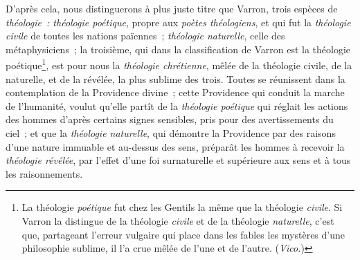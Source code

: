 \documentclass[french,twoside]{book} %
\begin{document}
D’après cela, nous distinguerons à plus juste titre que Varron, trois espèces de {\itshape théologie : théologie poétique}, propre aux {\itshape poètes théologiens}, et qui fut la {\itshape théologie civile} de toutes les nations païennes ; {\itshape théologie naturelle}, celle des métaphysiciens ; la troisième, qui dans la classification de Varron est la  théologie poétique\footnote{La théologie {\itshape poétique} fut chez les Gentils la même que la théologie {\itshape civile}. Si Varron la distingue de la théologie {\itshape civile} et de la théologie {\itshape naturelle}, c’est que, partageant l’erreur vulgaire qui place dans les fables les mystères d’une philosophie sublime, il l’a crue mêlée de l’une et de l’autre. ({\itshape Vico.})}, est pour nous la {\itshape théologie chrétienne}, mêlée de la théologie civile, de la naturelle, et de la révélée, la plus sublime des trois. Toutes se réunissent dans la contemplation de la Providence divine ; cette Providence qui conduit la marche de l’humanité, voulut qu’elle partît de la {\itshape théologie poétique} qui réglait les actions des hommes d’après certains signes sensibles, pris pour des avertissements du ciel ; et que la {\itshape théologie naturelle}, qui démontre la Providence par des raisons d’une nature immuable et au-dessus des sens, préparât les hommes à recevoir la {\itshape théologie révélée}, par l’effet d’une foi surnaturelle et supérieure aux sens et à tous les raisonnements.
\end{document}
